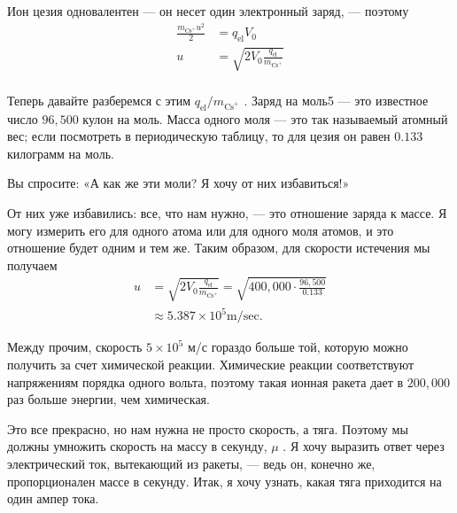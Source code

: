 \documentclass[11pt,oneside]{article}
\begin{document}
Ион цезия одновалентен --- он несет один электронный заряд, --- поэтому 
\begin{equation*} \begin{aligned} \frac{m_{\text{Cs}^+}u^2}{2} &= q_\text{el}V_0\\[1ex] u &= \sqrt{2V_0\frac{q_\text{el}}{m_{\text{Cs}^+}}}\\[1ex] \end{aligned} \tag{3.22}
\label{Eq:TIPS:3:22} \end{equation*}
\par

Теперь давайте разберемся с этим \(q_\text{el}/m_{\text{Cs}^+}\) . Заряд на моль5 --- это известное число \(96,\!500\) кулон на моль. Масса одного моля --- это так называемый атомный вес; если посмотреть в периодическую таблицу, то для цезия он равен \(0.133\) килограмм на моль.\par

Вы спросите: «А как же эти моли? Я хочу от них избавиться!»\par

От них уже избавились: все, что нам нужно, --- это отношение заряда к массе. Я могу измерить его для одного атома или для одного моля атомов, и это отношение будет одним и тем же. Таким образом, для скорости истечения мы получаем 
\begin{equation*} \begin{aligned} u &= \sqrt{2V_0\frac{q_\text{el}}{m_{\text{Cs}^+}}} = \sqrt{400,\!000 \cdot \frac{96,\!500}{0.133}}\\[1ex] &\approx 5.387 \times 10^5 \text{m/sec}. \end{aligned} \tag{3.23}
\label{Eq:TIPS:3:23} \end{equation*}
\par

Между прочим, скорость \(5 \times 10^5\) м/с гораздо больше той, которую можно получить за счет химической реакции. Химические реакции соответствуют напряжениям порядка одного вольта, поэтому такая ионная ракета дает в \(200,\!000\) раз больше энергии, чем химическая.\par

Это все прекрасно, но нам нужна не просто скорость, а тяга. Поэтому мы должны умножить скорость на массу в секунду, \(\mu\) . Я хочу выразить ответ через электрический ток, вытекающий из ракеты, --- ведь он, конечно же, пропорционален массе в секунду. Итак, я хочу узнать, какая тяга приходится на один ампер тока.\par
\end{document}
